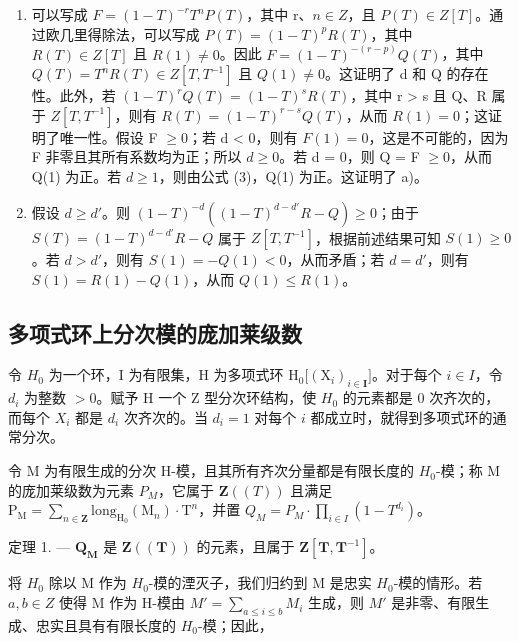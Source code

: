 \begin{enumerate}
\def\labelenumi{\alph{enumi})}
\item
  可以写成 \(F = (1 - T)^{-r} T^{n} P(T)\)，其中 r、\(n \in Z\)，且 \(P(T) \in Z[T]\)。通过欧几里得除法，可以写成 \(P(T) = (1 - T)^{p} R(T)\)，其中 \(R(T) \in Z[T]\) 且 \(R(1) \neq 0\)。因此 \(F = (1 - T)^{-(r-p)} Q(T)\)，其中 \(Q(T) = T^{n} R(T) \in Z[T, T^{-1}]\) 且 \(Q(1) \neq 0\)。这证明了 d 和 Q 的存在性。此外，若 \((1 - T)^{r} Q(T) = (1 - T)^{s} R(T)\)，其中 r \textgreater{} s 且 Q、R 属于 \(Z[T, T^{-1}]\)，则有 \(R(T) = (1 - T)^{r-s} Q(T)\)，从而 \(R(1) = 0\)；这证明了唯一性。假设 F \(\geqslant 0\)；若 d \textless{} 0，则有 \(F(1) = 0\)，这是不可能的，因为 F 非零且其所有系数均为正；所以 \(d \geqslant 0\)。若 d = 0，则 Q = F \(\geqslant 0\)，从而 Q(1) 为正。若 \(d \geqslant 1\)，则由公式 (3)，Q(1) 为正。这证明了 a)。
\item
  假设 \(d \geqslant d'\)。则 \((1 - T)^{-d}((1 - T)^{d - d'} R - Q) \geqslant 0\)；由于 \(S(T) = (1 - T)^{d - d'} R - Q\) 属于 \(Z[T, T^{-1}]\)，根据前述结果可知 \(S(1) \geqslant 0\)。若 \(d > d'\)，则有 \(S(1) = -Q(1) < 0\)，从而矛盾；若 \(d = d'\)，则有 \(S(1) = R(1) - Q(1)\)，从而 \(Q(1) \leqslant R(1)\)。
\end{enumerate}

\subsection{多项式环上分次模的庞加莱级数}

令 \(H_{0}\) 为一个环，I 为有限集，H 为多项式环 \(\mathrm{H}_{0}\big[(\mathrm{X}_{i})_{i\in\mathbf{I}}\big]\)。对于每个 \(i\in I\)，令 \(d_{i}\) 为整数 \(>0\)。赋予 H 一个 Z 型分次环结构，使 \(H_{0}\) 的元素都是 0 次齐次的，而每个 \(X_{i}\) 都是 \(d_{i}\) 次齐次的。当 \(d_{i}=1\) 对每个 \(i\) 都成立时，就得到多项式环的通常分次。

令 M 为有限生成的分次 H-模，且其所有齐次分量都是有限长度的 \(H_{0}\)-模；称 M 的庞加莱级数为元素 \(P_{M}\)，它属于 \(\mathbf{Z}((T))\) 且满足 \(\mathrm{P}_{\mathrm{M}} = \sum_{n \in \mathbf{Z}} \mathrm{long}_{\mathrm{H}_{0}}(\mathrm{M}_{n}) \cdot \mathrm{T}^{n}\)，并置 \(Q_{M} = P_{M} \cdot \prod_{i \in I} (1 - T^{d_{i}})\)。

定理 1. --- \(\mathbf{Q}_{\mathbf{M}}\) 是 \(\mathbf{Z}((\mathbf{T}))\) 的元素，且属于 \(\mathbf{Z}[\mathbf{T}, \mathbf{T}^{-1}]\)。

将 \(H_{0}\) 除以 M 作为 \(H_{0}\)-模的湮灭子，我们归约到 M 是忠实 \(H_{0}\)-模的情形。若 \(a, b \in Z\) 使得 M 作为 H-模由 \(M' = \sum_{a \leqslant i \leqslant b} M_{i}\) 生成，则 \(M'\) 是非零、有限生成、忠实且具有有限长度的 \(H_{0}\)-模；因此，

